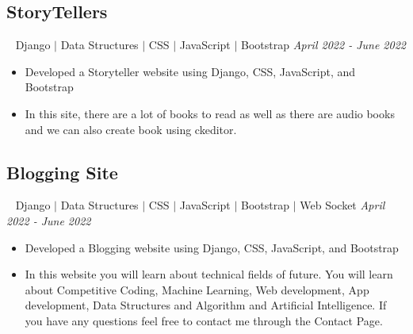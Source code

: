 \documentclass[12pt]{article}
\begin{document}
\subsection*{{StoryTellers}}~ Django $\vert$ Data Structures $\vert$ CSS $\vert$ JavaScript $\vert$ Bootstrap \hfill \textit{April 2022 - June 2022} \\
\begin{itemize}[leftmargin=*,topsep=0pt,itemsep=1pt,partopsep=1pt, parsep=1pt]
	\item Developed a Storyteller website using Django, CSS, JavaScript, and Bootstrap 
	\item In this site, there are a lot of books to read as well as there are audio books and we can also create book using ckeditor.
\end{itemize}
\subsection*{{Blogging Site}}~ Django $\vert$ Data Structures $\vert$ CSS $\vert$ JavaScript $\vert$ Bootstrap $\vert$ Web Socket \hfill \textit{April 2022 - June 2022} \\
\begin{itemize}[leftmargin=*,topsep=0pt,itemsep=1pt,partopsep=1pt, parsep=1pt]
	\item Developed a Blogging website using Django, CSS, JavaScript, and Bootstrap 
	\item In this website you will learn about technical fields of future.
You will learn about Competitive Coding,
Machine Learning,
Web development,
App development,
Data Structures and Algorithm
and Artificial Intelligence.
If you have any questions feel free to contact me through the Contact Page.
\end{itemize}
\end{document}
